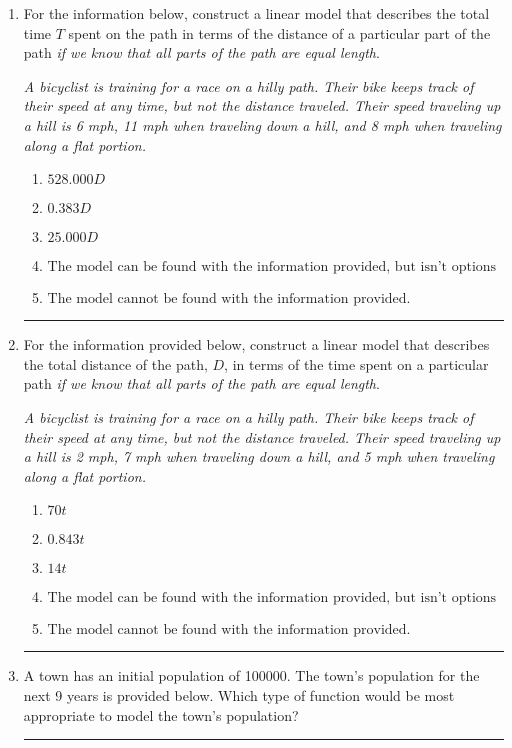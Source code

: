 \documentclass[14pt]{extbook}
\newcommand{\litem}[1]{\item#1\hspace*{-1cm}\rule{\textwidth}{0.4pt}}
\begin{document}
\begin{enumerate}
\litem{
For the information below, construct a linear model that describes the total time $T$ spent on the path in terms of the distance of a particular part of the path \textit{if we know that all parts of the path are equal length}.
\begin{center}
    \textit{ A bicyclist is training for a race on a hilly path. Their bike keeps track of their speed at any time, but not the distance traveled. Their speed traveling up a hill is 6 mph, 11 mph when traveling down a hill, and 8 mph when traveling along a flat portion. }
\end{center}
\begin{enumerate}[label=\Alph*.]
\item \( 528.000 D \)
\item \( 0.383 D \)
\item \( 25.000 D \)
\item \( \text{The model can be found with the information provided, but isn't options 1-3.} \)
\item \( \text{The model cannot be found with the information provided.} \)

\end{enumerate} }
\litem{
For the information provided below, construct a linear model that describes the total distance of the path, $D$, in terms of the time spent on a particular path \textit{if we know that all parts of the path are equal length}.
\begin{center}
    \textit{ A bicyclist is training for a race on a hilly path. Their bike keeps track of their speed at any time, but not the distance traveled. Their speed traveling up a hill is 2 mph, 7 mph when traveling down a hill, and 5 mph when traveling along a flat portion. }
\end{center}
\begin{enumerate}[label=\Alph*.]
\item \( 70 t \)
\item \( 0.843 t \)
\item \( 14 t \)
\item \( \text{The model can be found with the information provided, but isn't options 1-3.} \)
\item \( \text{The model cannot be found with the information provided.} \)

\end{enumerate} }
\litem{
A town has an initial population of 100000. The town's population for the next 9 years is provided below. Which type of function would be most appropriate to model the town's population?

}
\end{enumerate}
\end{document}
